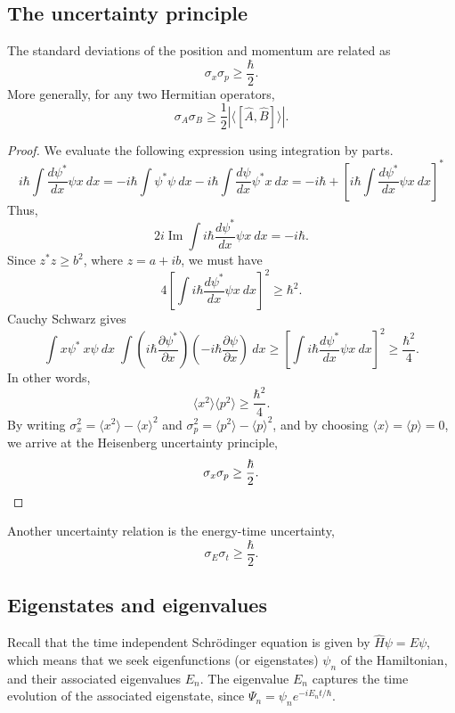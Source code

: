 \documentclass[11pt]{article}
\newcommand\ddx[1]{\frac{d #1}{d x}}
\newcommand\ppx[1]{\frac{\partial #1}{\partial x}}
\newcommand\E[1]{\langle #1 \rangle}
\theoremstyle{definition}
\theoremstyle{remark}
\numberwithin{equation}{section}
\begin{document}
    \newpage

    \subsection{The uncertainty principle}
    \begin{theorem}
        The standard deviations of the position and momentum are related as \[
            \sigma_x \sigma_p \geq \frac{\hbar}{2}.
        \] More generally, for any two Hermitian operators, \[
            \sigma_A \sigma_B \geq \frac{1}{2}|\E{[\hat{A}, \hat{B}]}|.
        \] 
    \end{theorem}
    \begin{proof}
        We evaluate the following expression using integration by parts. \[
            i\hbar \int \ddx{\psi^*}\psi x\:dx = -i\hbar\int \psi^*\psi\:dx - i\hbar
            \int \ddx{\psi}\psi^* x\:dx = -i\hbar + \left[i\hbar \int \ddx{\psi^*}
            \psi x\:dx\right]^*
        \]
         Thus, \[
            2i\operatorname{Im}\int i\hbar \ddx{\psi^*}\psi x\:dx = -i\hbar. 
        \] Since $z^*z \geq b^2$, where $z = a + ib$, we must have \[
            4\left[\int i\hbar \ddx{\psi^*}\psi x\:dx\right]^2 \geq \hbar^2.
        \] Cauchy Schwarz gives \[
            \int x\psi^*\:x\psi \:dx \;\int
            \left(i\hbar\ppx{\psi^*}\right)\left(-i\hbar\ppx{\psi}\right) \:dx \geq
            \left[\int i\hbar \ddx{\psi^*}\psi x\:dx\right]^2 \geq
            \frac{\hbar^2}{4}.
        \] In other words, \[
            \E{x^2}\E{p^2} \geq \frac{\hbar^2}{4}.
        \] By writing $\sigma_x^2 = \E{x^2} - \E{x}^2$ and $\sigma_p^2 = \E{p^2} -
        \E{p}^2$, and by choosing $\E{x} = \E{p} = 0$, we arrive at the Heisenberg
        uncertainty principle, \[
            \sigma_x\sigma_p \geq \frac{\hbar}{2}. \qedhere
        \]
    \end{proof}

    Another uncertainty relation is the energy-time uncertainty, \[
        \sigma_E \sigma_t \geq \frac{\hbar}{2}.
    \]

    \subsection{Eigenstates and eigenvalues}
    Recall that the time independent Schr\"odinger equation is given by $\hat{H}\psi
    = E\psi$, which means that we seek eigenfunctions (or eigenstates) $\psi_n$ of
    the Hamiltonian, and their associated eigenvalues $E_n$. The eigenvalue $E_n$
    captures the time evolution of the associated eigenstate, since $\Psi_n = \psi_n
    e^{-iE_n t/ \hbar}$.
\end{document}
